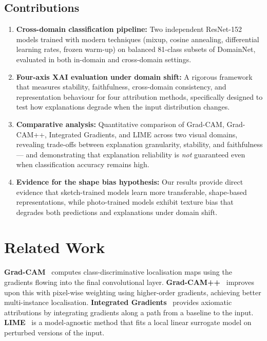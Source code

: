 \documentclass[12pt, a4paper]{article}
\begin{document}
\subsection{Contributions}

\begin{enumerate}[leftmargin=*]
    \item \textbf{Cross-domain classification pipeline:} Two independent
          ResNet-152 models trained with modern techniques (mixup, cosine
          annealing, differential learning rates, frozen warm-up) on balanced
          81-class subsets of DomainNet, evaluated in both in-domain and
          cross-domain settings.
    \item \textbf{Four-axis XAI evaluation under domain shift:} A rigorous
          framework that measures stability, faithfulness, cross-domain
          consistency, and representation behaviour for four attribution methods,
          specifically designed to test how explanations degrade when the input
          distribution changes.
    \item \textbf{Comparative analysis:} Quantitative comparison of Grad-CAM,
          Grad-CAM++, Integrated Gradients, and LIME across two visual domains,
          revealing trade-offs between explanation granularity, stability, and
          faithfulness --- and demonstrating that explanation reliability is
          \emph{not} guaranteed even when classification accuracy remains high.
    \item \textbf{Evidence for the shape bias hypothesis:} Our results provide
          direct evidence that sketch-trained models learn more transferable,
          shape-based representations, while photo-trained models exhibit
          texture bias that degrades both predictions and explanations under
          domain shift.
\end{enumerate}


\section{Related Work}
\label{sec:related}

\textbf{Grad-CAM}~\cite{selvaraju2017gradcam} computes class-discriminative
localisation maps using the gradients flowing into the final convolutional
layer.  \textbf{Grad-CAM++}~\cite{chattopadhay2018gradcampp} improves upon
this with pixel-wise weighting using higher-order gradients, achieving better
multi-instance localisation.  \textbf{Integrated Gradients}~\cite{sundararajan2017ig}
provides axiomatic attributions by integrating gradients along a path from a
baseline to the input.  \textbf{LIME}~\cite{ribeiro2016lime} is a
model-agnostic method that fits a local linear surrogate model on perturbed
versions of the input.
\end{document}
